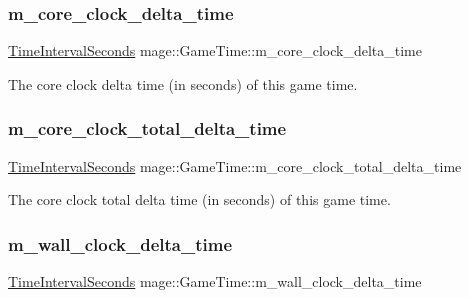 \subsubsection{\texorpdfstring{m\+\_\+core\+\_\+clock\+\_\+delta\+\_\+time}{m\_core\_clock\_delta\_time}}
{\footnotesize\ttfamily \mbox{\hyperlink{namespacemage_a21c3d1575018d1e0720948713c76be1f}{Time\+Interval\+Seconds}} mage\+::\+Game\+Time\+::m\+\_\+core\+\_\+clock\+\_\+delta\+\_\+time\hspace{0.3cm}{\ttfamily [private]}}

The core clock delta time (in seconds) of this game time. \mbox{\label{classmage_1_1_game_time_a497e7e9ad9cc20d0421dd55991e42caf}} 
\subsubsection{\texorpdfstring{m\+\_\+core\+\_\+clock\+\_\+total\+\_\+delta\+\_\+time}{m\_core\_clock\_total\_delta\_time}}
{\footnotesize\ttfamily \mbox{\hyperlink{namespacemage_a21c3d1575018d1e0720948713c76be1f}{Time\+Interval\+Seconds}} mage\+::\+Game\+Time\+::m\+\_\+core\+\_\+clock\+\_\+total\+\_\+delta\+\_\+time\hspace{0.3cm}{\ttfamily [private]}}

The core clock total delta time (in seconds) of this game time. \mbox{\label{classmage_1_1_game_time_ac4f77425277186cbd4a3219a38ae0a0a}} 
\subsubsection{\texorpdfstring{m\+\_\+wall\+\_\+clock\+\_\+delta\+\_\+time}{m\_wall\_clock\_delta\_time}}
{\footnotesize\ttfamily \mbox{\hyperlink{namespacemage_a21c3d1575018d1e0720948713c76be1f}{Time\+Interval\+Seconds}} mage\+::\+Game\+Time\+::m\+\_\+wall\+\_\+clock\+\_\+delta\+\_\+time\hspace{0.3cm}{\ttfamily [private]}}

